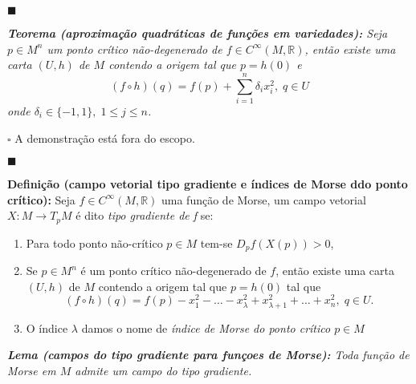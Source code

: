 \documentclass{article}
\begin{document}
	$\blacksquare$
	
	\vspace{2mm}
	\textit{\textbf{Teorema (aproximação quadráticas de funções em variedades):} Seja $p \in M^{n}$ um ponto crítico não-degenerado de $f \in C^{\infty}(M, \mathbb{R})$, então existe uma carta $(U, h)$ de $M$ contendo a origem tal que $p = h(0)$ e 
	$$
	(f \circ h) (q) = f(p) + \sum_{i=1}^{n}\delta_{i}x_{i}^{2}, \; q \in U
	$$
	onde $\delta_{i} \in \{-1,1\}, \; 1\leq j \leq n$.}
	
	$\square$ A demonstração está fora do escopo.	
	
	$\blacksquare$
	
	\vspace{2mm}
	\textbf{Definição (campo vetorial tipo gradiente e índices de Morse ddo ponto crítico):} Seja $f \in C^{\infty}(M, \mathbb{R})$ uma função de Morse, um campo vetorial $X : M \to T_{p}M$ é dito \textit{tipo gradiente de f} se:
	\begin{enumerate}
		\item Para todo ponto não-crítico $p \in M$ tem-se 	
		$D_{p}f(X(p)) > 0$,
		
		\item Se $p \in M^{n}$ é um ponto crítico não-degenerado de $f$, então existe uma carta $(U, h)$ de $M$ contendo a origem tal que $p = h(0)$ tal que
		$$
		(f \circ h) (q) = f(p) - x_{1}^{2} - \dots - x_{\lambda}^{2} + x_{\lambda + 1}^{2} + \dots + x_{n}^{2}, \; q \in U.
		$$ 
		
		\item O índice $\lambda$ damos o nome de \textit{índice de Morse do ponto crítico $p \in M$}
	\end{enumerate}
	
	\vspace{2mm}
	\textit{\textbf{Lema (campos do tipo gradiente para funçoes de Morse):} Toda função de Morse em $M$ admite um campo do tipo gradiente.}
	
\end{document}
